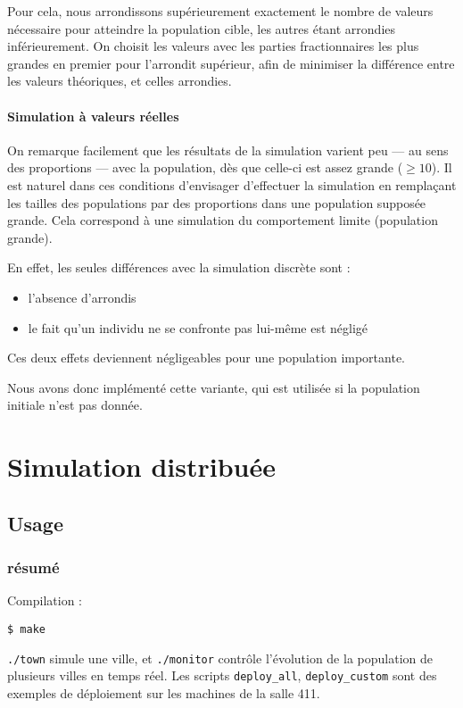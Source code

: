 \documentclass[10pt]{article}
\begin{document}
Pour cela, nous arrondissons supérieurement exactement le nombre de valeurs nécessaire pour atteindre
la population cible, les autres étant arrondies inférieurement. 
On choisit les valeurs avec les parties fractionnaires les plus grandes en premier pour l'arrondit supérieur,
afin de minimiser la différence entre les valeurs théoriques, et celles arrondies.

\paragraph{Simulation à valeurs réelles}
On remarque facilement que les résultats de la simulation varient peu --- au sens des proportions --- avec la population, dès que celle-ci
est assez grande ($\ge 10$).
Il est naturel dans ces conditions d'envisager d'effectuer la simulation en remplaçant les tailles des populations
par des proportions dans une population supposée grande. Cela correspond à une simulation du comportement limite (population grande).

En effet, les seules différences avec la simulation discrète sont :
\begin{itemize}
\item l'absence d'arrondis
\item le fait qu'un individu ne se confronte pas lui-même est négligé
\end{itemize}
Ces deux effets deviennent négligeables pour une population importante.

Nous avons donc implémenté cette variante, qui est utilisée si la population initiale n'est pas donnée.

\clearpage
\section{Simulation distribuée}
\subsection{Usage}
\subsubsection*{résumé}
Compilation :
\begin{verbatim}
$ make
\end{verbatim}

\verb|./town| simule une ville, et \verb|./monitor| contrôle l'évolution de la population de plusieurs villes en temps réel.
Les scripts \verb|deploy_all|, \verb|deploy_custom| sont des exemples de déploiement sur les machines de la salle 411.
\end{document}
